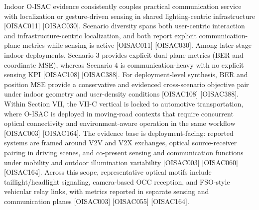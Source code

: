 {}\markdownRendererUlBeginTight
\markdownRendererUlItem Indoor O-ISAC evidence consistently couples practical communication service with localization or gesture-driven sensing in shared lighting-centric infrastructure [O\markdownRendererUnderscore{}ISAC\markdownRendererUnderscore{}011] [O\markdownRendererUnderscore{}ISAC\markdownRendererUnderscore{}030].\markdownRendererUlItemEnd 
\markdownRendererUlItem Scenario diversity spans both user-centric interaction and infrastructure-centric localization, and both report explicit communication-plane metrics while sensing is active [O\markdownRendererUnderscore{}ISAC\markdownRendererUnderscore{}011] [O\markdownRendererUnderscore{}ISAC\markdownRendererUnderscore{}030].\markdownRendererUlItemEnd 
\markdownRendererUlItem Among later-stage indoor deployments, Scenario 3 provides explicit dual-plane metrics (BER and coordinate MSE), whereas Scenario 4 is communication-heavy with no explicit sensing KPI [O\markdownRendererUnderscore{}ISAC\markdownRendererUnderscore{}108] [O\markdownRendererUnderscore{}ISAC\markdownRendererUnderscore{}388].\markdownRendererUlItemEnd 
\markdownRendererUlItem For deployment-level synthesis, BER and position MSE provide a conservative and evidenced cross-scenario objective pair under indoor geometry and user-density conditions [O\markdownRendererUnderscore{}ISAC\markdownRendererUnderscore{}108] [O\markdownRendererUnderscore{}ISAC\markdownRendererUnderscore{}388].\markdownRendererUlItemEnd 
\markdownRendererUlEndTight \markdownRendererInterblockSeparator
{}
\markdownRendererSectionEnd 
\markdownRendererSectionEnd \markdownRendererSectionBegin
{}\markdownRendererInterblockSeparator
{}\markdownRendererSectionBegin
{}\markdownRendererInterblockSeparator
{}Within Section VII, the VII-C vertical is locked to automotive transportation, where O-ISAC is deployed in moving-road contexts that require concurrent optical connectivity and environment-aware operation in the same workflow [O\markdownRendererUnderscore{}ISAC\markdownRendererUnderscore{}003] [O\markdownRendererUnderscore{}ISAC\markdownRendererUnderscore{}164]. The evidence base is deployment-facing: reported systems are framed around V2V and V2X exchanges, optical source-receiver pairing in driving scenes, and co-present sensing and communication functions under mobility and outdoor illumination variability [O\markdownRendererUnderscore{}ISAC\markdownRendererUnderscore{}003] [O\markdownRendererUnderscore{}ISAC\markdownRendererUnderscore{}060] [O\markdownRendererUnderscore{}ISAC\markdownRendererUnderscore{}164]. Across this scope, representative optical motifs include taillight/headlight signaling, camera-based OCC reception, and FSO-style vehicular relay links, with metrics reported in separate sensing and communication planes [O\markdownRendererUnderscore{}ISAC\markdownRendererUnderscore{}003] [O\markdownRendererUnderscore{}ISAC\markdownRendererUnderscore{}055] [O\markdownRendererUnderscore{}ISAC\markdownRendererUnderscore{}164].\markdownRendererInterblockSeparator

